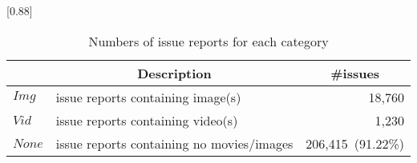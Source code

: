 
\begin{table}[t]
    \begin{center}
    \caption{Numbers of issue reports for each category}
    \scalebox{0.88}[0.88]{
    \begin{tabular}{llr}
        \toprule
         & \multicolumn{1}{c}{\textbf{Description}} & \multicolumn{1}{c}{\textbf{\#issues}} \\
        \midrule
        $Img$  & issue reports containing image(s) & 18,760\hspace{2.5mm}{\small (9.09\%)}\\%
        $Vid$  & issue reports containing video(s) & 1,230\hspace{2.5mm}{\small (0.54\%)}\\%
        $None$ & issue reports containing no movies/images & 206,415~{\small (91.22\%)}\\ 
        \bottomrule
    \end{tabular}
    }
    \label{tab:issue-category}
    \end{center}
    
\end{table}
